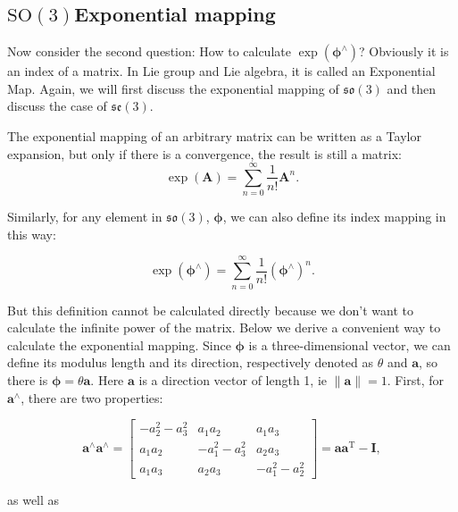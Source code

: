 \subsection{$\mathrm{SO}(3)$Exponential mapping}

Now consider the second question: How to calculate $\exp ( \boldsymbol{\phi}^{\wedge} )$? Obviously it is an index of a matrix. In Lie group and Lie algebra, it is called an Exponential Map. Again, we will first discuss the exponential mapping of $\mathfrak{so}(3)$ and then discuss the case of $\mathfrak{se}(3)$.

The exponential mapping of an arbitrary matrix can be written as a Taylor expansion, but only if there is a convergence, the result is still a matrix:
\begin{equation}
\exp(\bm{A}) = \sum\limits_{n = 0}^\infty {\frac{1}{{n!}}{ \bm{A}^n}}.
\end{equation}

Similarly, for any element in $\mathfrak{so}(3)$, $\boldsymbol{\phi}$, we can also define its index mapping in this way:

\begin{equation}
\exp(\boldsymbol{\phi}^\wedge) = \sum\limits_{n = 0}^\infty {\frac{1}{{n!}}{ (\boldsymbol{\phi}^{\wedge })^n}}.
\end{equation}

But this definition cannot be calculated directly because we don't want to calculate the infinite power of the matrix. Below we derive a convenient way to calculate the exponential mapping. Since $\boldsymbol{\phi}$ is a three-dimensional vector, we can define its modulus length and its direction, respectively denoted as $\theta$ and $\bm{a}$, so there is $\boldsymbol{\phi} = \theta \bm{a}$. Here $\bm{a}$ is a direction vector of length 1, ie $\| \bm{a} \| =1$. First, for $\bm{a}^\wedge$, there are two properties: %

\begin{equation}
 \bm{a}^{\wedge} \bm{a}^{\wedge} = \left[ {\begin{array}{*{20}{c}}
{ - a_2^2 - a_3^2}&{{a_1}{a_2}}&{{a_1}{a_3}}\\
{{a_1}{a_2}}&{ - a_1^2 - a_3^2}&{{a_2}{a_3}}\\
{{a_1}{a_3}}&{{a_2}{a_3}}&{ - a_1^2 - a_2^2}
\end{array}} \right] = \bm{a} \bm{a}^\mathrm{T} - \bm{I},
\end{equation}

as well as

